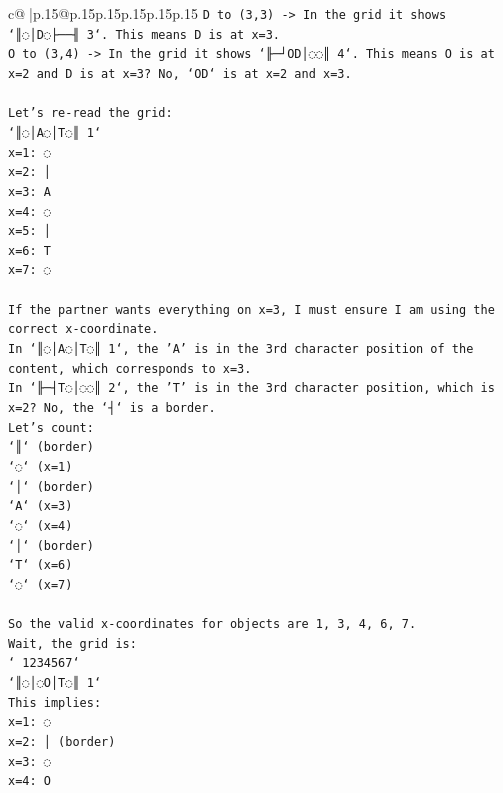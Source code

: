 \documentclass{article}
\begin{document}
{\begin{supertabular}{c@{$\;$}|p{.15\linewidth}@{}p{.15\linewidth}p{.15\linewidth}p{.15\linewidth}p{.15\linewidth}p{.15\linewidth}}
{{{\texttt{D to (3,3) {-}> In the grid it shows `║◌│D◌├──╢ 3`. This means D is at x=3.} \\
\texttt{O to (3,4) {-}> In the grid it shows `╟─┘OD│◌◌║ 4`. This means O is at x=2 and D is at x=3? No, `OD` is at x=2 and x=3.} \\
\\ 
\texttt{Let's re{-}read the grid:} \\
\texttt{`║◌│A◌│T◌║ 1`} \\
\texttt{x=1: ◌} \\
\texttt{x=2: │} \\
\texttt{x=3: A} \\
\texttt{x=4: ◌} \\
\texttt{x=5: │} \\
\texttt{x=6: T} \\
\texttt{x=7: ◌} \\
\\ 
\texttt{If the partner wants everything on x=3, I must ensure I am using the correct x{-}coordinate.} \\
\texttt{In `║◌│A◌│T◌║ 1`, the 'A' is in the 3rd character position of the content, which corresponds to x=3.} \\
\texttt{In `╟─┤T◌│◌◌║ 2`, the 'T' is in the 3rd character position, which is x=2? No, the `┤` is a border.} \\
\texttt{Let's count:} \\
\texttt{`║` (border)} \\
\texttt{`◌` (x=1)} \\
\texttt{`│` (border)} \\
\texttt{`A` (x=3)} \\
\texttt{`◌` (x=4)} \\
\texttt{`│` (border)} \\
\texttt{`T` (x=6)} \\
\texttt{`◌` (x=7)} \\
\\ 
\texttt{So the valid x{-}coordinates for objects are 1, 3, 4, 6, 7.} \\
\texttt{Wait, the grid is:} \\
\texttt{` 1234567`} \\
\texttt{`║◌│◌O│T◌║ 1`} \\
\texttt{This implies:} \\
\texttt{x=1: ◌} \\
\texttt{x=2: │ (border)} \\
\texttt{x=3: ◌} \\
\texttt{x=4: O} \\
}}}
\end{supertabular}}
\end{document}
